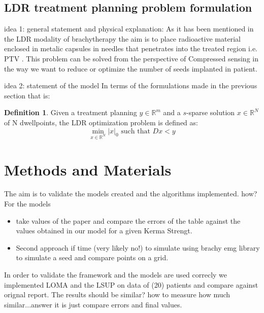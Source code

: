 \documentclass[12pt]{article}
\theoremstyle{definition}
\newtheorem{definition}{Definition}[section]
\begin{document}
\subsection{LDR treatment planning problem formulation}
idea 1:  general statement and physical explanation:
As it has been mentioned in the LDR modality of brachytherapy the aim is to place radioactive material enclosed in metalic capsules in needles that penetrates into the treated region i.e. PTV \cite{defintion of ptv}. This problem can be solved from the perspective of Compressed sensing in the way we want to reduce or optimize the number of seeds implanted in patient.\par
idea 2: statement of the model
In terms of the formulations made in the previous section that is:
\begin{definition}
Given a treatment planning $y\in\mathbb{R}^m$ and a $s$-sparse solution $x\in\mathbb{R}^N$ of N dwellpoints, the LDR optimization problem is defined as: 
\begin{equation}
    \min_{x\in\mathbb{R}^N} |x|_0 \text{   such that   } Dx<y
\end{equation}
\end{definition}
\section{Methods and Materials}
The aim is to validate the models created and the algorithms implemented. how? For the models
\begin{itemize}
    \item take values of the paper and compare the errors of the table against the values obtained in our model for a given Kerma Strengt.
    \item Second approach if time (very likely no!) to simulate using brachy emg library to simulate a seed and compare points on a grid.
\end{itemize}
In order to validate the framework and the models are used correcly we implemented LOMA and the LSUP on data of (20) patients and compare against orignal report. The results should be similar? how to measure how much similar...answer it is just compare errors and final values.\par
\end{document}
